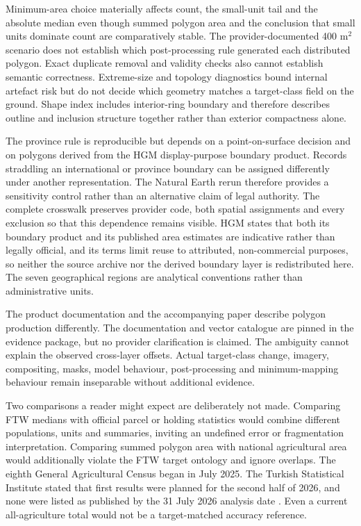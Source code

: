 \documentclass[pdflatex,sn-basic]{sn-jnl}
\begin{document}
Minimum-area choice materially affects count, the small-unit tail and the absolute median even though summed polygon area and the conclusion that small units dominate count are comparatively stable. The provider-documented 400 m$^{2}$ scenario does not establish which post-processing rule generated each distributed polygon. Exact duplicate removal and validity checks also cannot establish semantic correctness. Extreme-size and topology diagnostics bound internal artefact risk but do not decide which geometry matches a target-class field on the ground. Shape index includes interior-ring boundary and therefore describes outline and inclusion structure together rather than exterior compactness alone.

The province rule is reproducible but depends on a point-on-surface decision and on polygons derived from the HGM display-purpose boundary product. Records straddling an international or province boundary can be assigned differently under another representation. The Natural Earth rerun therefore provides a sensitivity control rather than an alternative claim of legal authority. The complete crosswalk preserves provider code, both spatial assignments and every exclusion so that this dependence remains visible. HGM states that both its boundary product and its published area estimates are indicative rather than legally official, and its terms limit reuse to attributed, non-commercial purposes, so neither the source archive nor the derived boundary layer is redistributed here. The seven geographical regions are analytical conventions rather than administrative units.

The product documentation and the accompanying paper describe polygon production differently. The documentation and vector catalogue are pinned in the evidence package, but no provider clarification is claimed. The ambiguity cannot explain the observed cross-layer offsets. Actual target-class change, imagery, compositing, masks, model behaviour, post-processing and minimum-mapping behaviour remain inseparable without additional evidence.

Two comparisons a reader might expect are deliberately not made. Comparing FTW medians with official parcel or holding statistics would combine different populations, units and summaries, inviting an undefined error or fragmentation interpretation. Comparing summed polygon area with national agricultural area would additionally violate the FTW target ontology and ignore overlaps. The eighth General Agricultural Census began in July 2025. The Turkish Statistical Institute stated that first results were planned for the second half of 2026, and none were listed as published by the 31 July 2026 analysis date \citep{turkish_statistical_institute_general_census_2026}. Even a current all-agriculture total would not be a target-matched accuracy reference.
\end{document}
